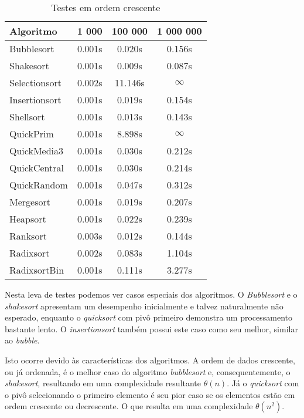 \documentclass[
	11pt,
	oneside,
	a4paper,
	english,
	brazil,
	]{article}
\begin{document}
\begin{table}[ht]
\centering
\begin{tabular}{lccc}
\hline 
\textbf{Algoritmo} & \textbf{1 000} & \textbf{100 000} &  \textbf{1 000 000}  \\
\hline
Bubblesort   	& 0.001s & 0.020s   & 0.156s     \\
Shakesort  		& 0.001s & 0.009s   & 0.087s     \\
Selectionsort	& 0.002s & 11.146s  & $\infty$   \\
Insertionsort  	& 0.001s & 0.019s   & 0.154s     \\
Shellsort 		& 0.001s & 0.013s   & 0.143s     \\
QuickPrim		& 0.001s & 8.898s   & $\infty$   \\
QuickMedia3		& 0.001s & 0.030s   & 0.212s     \\
QuickCentral	& 0.001s & 0.030s   & 0.214s     \\
QuickRandom		& 0.001s & 0.047s   & 0.312s     \\
Mergesort 		& 0.001s & 0.019s   & 0.207s     \\
Heapsort 		& 0.001s & 0.022s   & 0.239s     \\
Ranksort 		& 0.003s & 0.012s   & 0.144s     \\
Radixsort 		& 0.002s & 0.083s   & 1.104s     \\
RadixsortBin 	& 0.001s & 0.111s   & 3.277s     \\
\hline
\end{tabular}
\caption{Testes em ordem crescente}
\label{tab:c}
\end{table}

Nesta leva de testes podemos ver casos especiais dos algoritmos. O
\textit{Bubblesort} e o \textit{shakesort} apresentam um desempenho 
inicialmente e talvez naturalmente não esperado, enquanto o \textit{quicksort} 
com pivô primeiro demonstra um processamento bastante lento. O
\textit{insertionsort} também possui este caso como seu melhor, similar
ao \textit{bubble}.

Isto ocorre devido às características dos algoritmos. A ordem de dados crescente, 
ou já ordenada, é o melhor  caso do algoritmo \textit{bubblesort} e, 
consequentemente, o \textit{shakesort}, resultando em uma complexidade 
resultante $\theta(n)$. Já o \textit{quicksort} com o pivô selecionando o 
primeiro elemento é seu pior caso se os elementos  estão em ordem crescente 
ou decrescente. O que resulta em uma complexidade $\theta(n^2)$.
\end{document}
